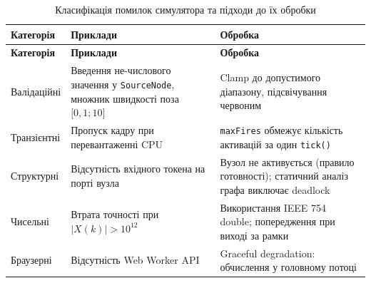 \documentclass[
]{article}
\newcommand{\passthrough}[1]{#1}
\begin{document}
\begin{longtable}[]{@{}
  >{\raggedright\arraybackslash}p{}
  >{\raggedright\arraybackslash}p{}
  >{\raggedright\arraybackslash}p{}@{}}
\caption[Класифікація помилок симулятора та підходи до їх
обробки]{Класифікація помилок симулятора та підходи до їх
обробки}\tabularnewline
\toprule\noalign{}
\begin{minipage}[b]{\linewidth}\raggedright
\textbf{Категорія}
\end{minipage} & \begin{minipage}[b]{\linewidth}\raggedright
\textbf{Приклади}
\end{minipage} & \begin{minipage}[b]{\linewidth}\raggedright
\textbf{Обробка}
\end{minipage} \\
\midrule\noalign{}
\endfirsthead
\toprule\noalign{}
\begin{minipage}[b]{\linewidth}\raggedright
\textbf{Категорія}
\end{minipage} & \begin{minipage}[b]{\linewidth}\raggedright
\textbf{Приклади}
\end{minipage} & \begin{minipage}[b]{\linewidth}\raggedright
\textbf{Обробка}
\end{minipage} \\
\midrule\noalign{}
\endhead
\bottomrule\noalign{}
\endlastfoot
Валідаційні & Введення не-числового значення у
\passthrough{\lstinline!SourceNode!}, множник швидкості поза
\(\lbrack 0,1;10\rbrack\) & Clamp до допустимого діапазону,
підсвічування червоним \\
Транзієнтні & Пропуск кадру при перевантаженні CPU &
\passthrough{\lstinline!maxFires!} обмежує кількість активацій за один
\passthrough{\lstinline!tick!}\passthrough{\lstinline!()!} \\
Структурні & Відсутність вхідного токена на порті вузла & Вузол не
активується (правило готовності); статичний аналіз графа виключає
deadlock \\
Чисельні & Втрата точності при \(|X(k)| > 10^{12}\) & Використання IEEE
754 double; попередження при виході за рамки \\
Браузерні & Відсутність Web Worker API & Graceful degradation:
обчислення у головному потоці \\
\end{longtable}
\end{document}
